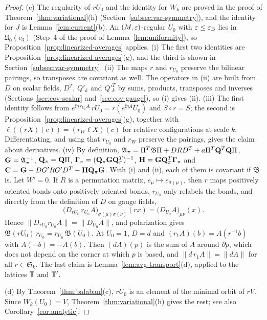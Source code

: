 \begin{proof}
(c) The regularity of $rU_0$ and the identity for $W_k$ are proved in the proof of Theorem~\ref{thm:variational}(h) (Section~\ref{subsec:var-symmetry}), and the identity for $J$ is Lemma~\ref{lem:current}(b). An $(M,\varepsilon)$-regular $U_0$ with $\varepsilon\le\varepsilon_{\rm B}$ lies in $\mathfrak U_0(c_3)$ (Step~4 of the proof of Lemma~\ref{lem:uniformity}), so Proposition~\ref{prop:linearized-averages} applies. (i) The first two identities are Proposition~\ref{prop:linearized-averages}(g), and the third is shown in Section~\ref{subsec:var-symmetry}. (ii) The maps $r$ and $r_{U_0}$ preserve the bilinear pairings, so transposes are covariant as well. The operators in (ii) are built from $D$ on scalar fields, $D^T$, $Q'_k$ and $Q'^T_k$ by sums, products, transposes and inverses (Sections~\ref{sec:cov-scalar} and~\ref{sec:cov-gauge}), so (i) gives (ii). (iii) The first identity follows from $e^{\ii\eta\,r_{U_0}A}\,rU_0=r(e^{\ii\eta A}U_0)$ and $S\circ r=S$; the second is Proposition~\ref{prop:linearized-averages}(g), together with $\ell((rX)(c))=(r_W\ell X)(c)$ for relative configurations at scale $k$. Differentiating, and using that $r_{U_0}$ and $r_W$ preserve the pairings, gives the claim about derivatives. (iv) By definition, $\mathfrak A_\pi=\Pi^T\mathfrak B\Pi+DRD^T+a\Pi^T\mathbf Q^T\mathbf Q\Pi$, $\mathbf G=\mathfrak A_\pi^{-1}$, $\mathbf Q_\pi=\mathbf Q\Pi$, $\boldsymbol\Gamma_\pi=(\mathbf Q_\pi\mathbf G\mathbf Q_\pi^T)^{-1}$, $\mathbf H=\mathbf G\mathbf Q_\pi^T\boldsymbol\Gamma_\pi$ and $\mathbf C=\mathbf G-DG'RG'D^T-\mathbf H\mathbf Q_\pi\mathbf G$. With (i) and (ii), each of them is covariant if $\mathfrak B$ is. Let $W'=0$. If $R$ is a permutation matrix, $e_\mu\mapsto e_{\sigma(\mu)}$, then $r$ maps positively oriented bonds onto positively oriented bonds, $r_{U_0}$ only relabels the bonds, and directly from the definition of $D$ on gauge fields,
\[
\big(D_{rU_0}\,r_{U_0}A\big)_{\sigma(\mu)\sigma(\nu)}(rx)=\big(D_{U_0}A\big)_{\mu\nu}(x).
\]
Hence $\|D_{rU_0}r_{U_0}A\|=\|D_{U_0}A\|$, and polarization gives $\mathfrak B(rU_0)\,r_{U_0}=r_{U_0}\,\mathfrak B(U_0)$. At $U_0=1$, $D=d$ and $(r_1A)(b)=A(r^{-1}b)$ with $A(-b)=-A(b)$. Then $(dA)(p)$ is the sum of $A$ around $\partial p$, which does not depend on the corner at which $p$ is based, and $\|d\,r_1A\|=\|dA\|$ for all $r\in\mathfrak S_k$. The last claim is Lemma~\ref{lem:avg-transport}(d), applied to the lattices $\mathbb T$ and $\mathbb T'$.

(d) By Theorem~\ref{thm:balaban}(c), $rU_0$ is an element of the minimal orbit of $rV$. Since $W_k(U_0)=V$, Theorem~\ref{thm:variational}(h) gives the rest; see also Corollary~\ref{cor:analytic}.
\end{proof}

